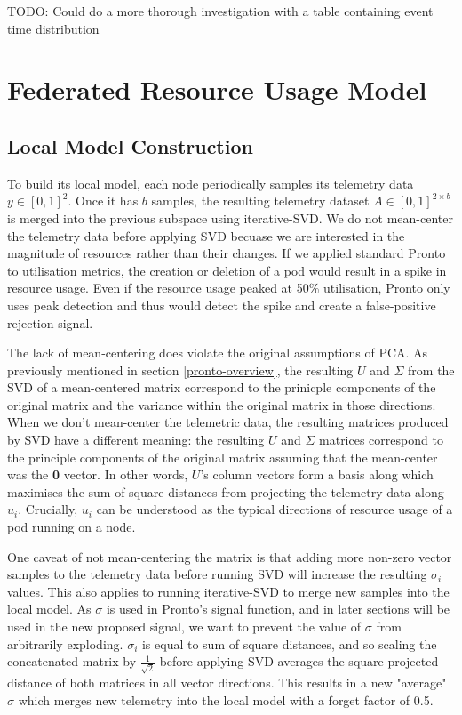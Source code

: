 TODO: Could do a more thorough investigation with a table containing event
time distribution

\section{Federated Resource Usage Model}

\subsection{Local Model Construction}
\label{sec:local-model-construction}

To build its local model, each node periodically samples its telemetry data $y
\in [0,1]^{2}$. Once it has $b$ samples, the resulting telemetry dataset $A \in
[0,1]^{2 \times b}$ is merged into the previous subspace using iterative-SVD. We
do not mean-center the telemetry data before applying SVD becuase we are
interested in the magnitude of resources rather than their changes. If we
applied standard Pronto to utilisation metrics, the creation or deletion of a
pod would result in a spike in resource usage. Even if the resource usage peaked
at 50\% utilisation, Pronto only uses peak detection and thus would detect the
spike and create a false-positive rejection signal.

The lack of mean-centering does violate the original assumptions of PCA. As
previously mentioned in section \ref{pronto-overview}, the resulting $U$ and
$\Sigma$ from the SVD of a mean-centered matrix correspond to the prinicple
components of the original matrix and the variance within the original matrix in
those directions. When we don't mean-center the telemetric data, the resulting
matrices produced by SVD have a different meaning: the resulting $U$ and
$\Sigma$ matrices correspond to the principle components of the original matrix
assuming that the mean-center was the \textbf{0} vector. In other words, $U$'s
column vectors form a basis along which maximises the sum of square distances
from projecting the telemetry data along $u_i$. Crucially, $u_i$ can be
understood as the typical directions of resource usage of a pod running on a
node.

One caveat of not mean-centering the matrix is that adding more non-zero
vector samples to the telemetry data before running SVD will increase the
resulting $\sigma_i$ values. This also applies to running iterative-SVD to merge
new samples into the local model. As $\sigma$ is used in Pronto's signal
function, and in later sections will be used in the new proposed signal, we want
to prevent the value of $\sigma$ from arbitrarily exploding. $\sigma_i$ is equal to sum of square
distances, and so scaling the concatenated matrix by $\frac{1}{\sqrt{2}}$ before
applying SVD averages the square projected distance of both matrices in all
vector directions. This results in a new "average" $\sigma$ which merges new
telemetry into the local model with a forget factor of 0.5.

